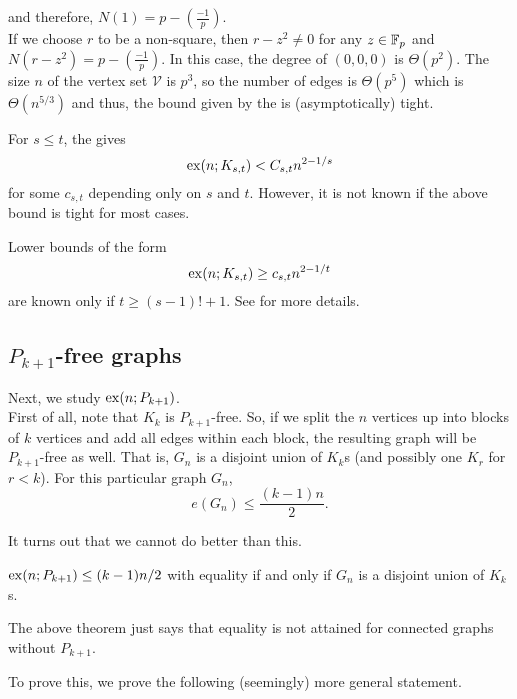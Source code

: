 			and therefore, $N(1) = p - \left(\frac{-1}{p}\right)$.\\
			If we choose $r$ to be a non-square, then $r-z^2 \neq 0$ for any $z\in\mathbb{F}_p$ and $N(r-z^2) = p - \left(\frac{-1}{p}\right)$. In this case, the degree of $(0,0,0)$ is $\Theta(p^2)$. The size $n$ of the vertex set $\mathcal{V}$ is $p^3$, so the number of edges is $\Theta(p^5)$ which is $\Theta(n^{5/3})$ and thus, the bound given by the  is (asymptotically) tight.


			For $s \le t$, the  gives
			\[ \operatorname{ex}(n;K_{s,t}) < C_{s,t} n^{2 - 1/s} \]
			for some $c_{s,t}$ depending only on $s$ and $t$. However, it is not known if the above bound is tight for most cases.

			Lower bounds of the form
			\[ \operatorname{ex}(n;K_{s,t}) \ge c_{s,t} n^{2 - 1/t} \]
			are known only if $t \ge (s-1)! + 1$. See \cite{ref-1} for more details.

	\subsection{\texorpdfstring{$P_{k+1}$}{P k+1}-free graphs}

		Next, we study $\operatorname{ex}(n;P_{k+1})$.\\

		First of all, note that $K_k$ is $P_{k+1}$-free. So, if we split the $n$ vertices up into blocks of $k$ vertices and add all edges within each block, the resulting graph will be $P_{k+1}$-free as well. That is, $G_n$ is a disjoint union of $K_k$s (and possibly one $K_r$ for $r < k$). For this particular graph $G_n$,
		\[ e(G_n) \le \frac{(k-1)n}{2}. \]

		It turns out that we cannot do better than this.

		\begin{ftheo}
			\label{theo: exx n P k+1}
			$\operatorname{ex}(n;P_{k+1}) \le (k-1)n/2$ with equality if and only if $G_n$ is a disjoint union of $K_k$s.
		\end{ftheo}

		The above theorem just says that equality is not attained for connected graphs without $P_{k+1}$.

		To prove this, we prove the following (seemingly) more general statement.

